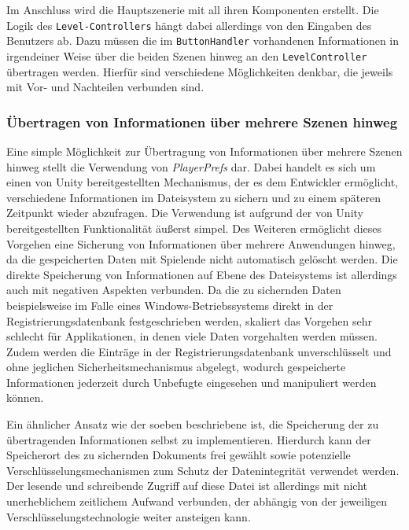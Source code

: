 Im Anschluss wird die Hauptszenerie mit all ihren Komponenten erstellt. Die Logik des \texttt{Level-\linebreak Controllers} hängt dabei allerdings von den Eingaben des Benutzers ab. Dazu müssen die im \texttt{ButtonHandler} vorhandenen Informationen in irgendeiner Weise über die beiden Szenen hinweg an den \texttt{LevelController} übertragen werden. Hierfür sind verschiedene Möglichkeiten denkbar, die jeweils mit Vor- und Nachteilen verbunden sind.

\subsubsection{Übertragen von Informationen über mehrere Szenen hinweg}

Eine simple Möglichkeit zur Übertragung von Informationen über mehrere Szenen hinweg stellt die Verwendung von \textit{PlayerPrefs} \cite{Unity_Doc_PlayerPrefs} dar. Dabei handelt es sich um einen von Unity bereitgestellten Mechanismus, der es dem Entwickler ermöglicht, verschiedene Informationen im Dateisystem zu sichern und zu einem späteren Zeitpunkt wieder abzufragen. Die Verwendung ist aufgrund der von Unity bereitgestellten Funktionalität äußerst simpel. Des Weiteren ermöglicht dieses Vorgehen eine Sicherung von Informationen über mehrere Anwendungen hinweg, da die gespeicherten Daten mit Spielende nicht automatisch gelöscht werden. Die direkte Speicherung von Informationen auf Ebene des Dateisystems ist allerdings auch mit negativen Aspekten verbunden. Da die zu sichernden Daten beispielsweise im Falle eines Windows-Betriebssystems direkt in der Registrierungsdatenbank festgeschrieben werden, skaliert das Vorgehen sehr schlecht für Applikationen, in denen viele Daten vorgehalten werden müssen. Zudem werden die Einträge in der Registrierungsdatenbank unverschlüsselt und ohne jeglichen Sicherheitsmechanismus abgelegt, wodurch gespeicherte Informationen jederzeit durch Unbefugte eingesehen und manipuliert werden können. 

Ein ähnlicher Ansatz wie der soeben beschriebene ist, die Speicherung der zu übertragenden Informationen selbst zu implementieren. Hierdurch kann der Speicherort des zu sichernden Dokuments frei gewählt sowie potenzielle Verschlüsselungsmechanismen zum Schutz der Datenintegrität verwendet werden. Der lesende und schreibende Zugriff auf diese Datei ist allerdings mit nicht unerheblichem zeitlichem Aufwand verbunden, der abhängig von der jeweiligen Verschlüsselungstechnologie weiter ansteigen kann.

